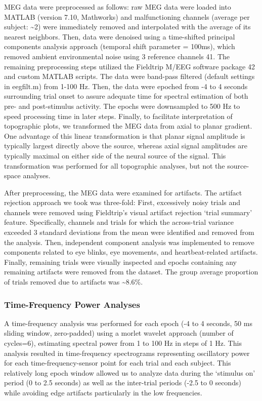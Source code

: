 MEG data were preprocessed as follows: raw MEG data were loaded into
MATLAB (version 7.10, Mathworks) and malfunctioning channels (average
per subject: \textasciitilde{}2) were immediately removed and
interpolated with the average of its nearest neighbors. Then, data were
denoised using a time-shifted principal components analysis approach
(temporal shift parameter = 100ms), which removed ambient environmental
noise using 3 reference channels 41. The remaining preprocessing steps
utilized the Fieldtrip M/EEG software package 42 and custom MATLAB
scripts. The data were band-pass filtered (default settings in
eegfilt.m) from 1-100 Hz. Then, the data were epoched from -4 to 4
seconds surrounding trial onset to assure adequate time for spectral
estimation of both pre- and post-stimulus activity. The epochs were
downsampled to 500 Hz to speed processing time in later steps. Finally,
to facilitate interpretation of topographic plots, we transformed the
MEG data from axial to planar gradient. One advantage of this linear
transformation is that planar signal amplitude is typically largest
directly above the source, whereas axial signal amplitudes are typically
maximal on either side of the neural source of the signal. This
transformation was performed for all topographic analyses, but not the
source-space analyses.

After preprocessing, the MEG data were examined for artifacts. The
artifact rejection approach we took was three-fold: First, excessively
noisy trials and channels were removed using Fieldtrip's visual artifact
rejection `trial summary' feature. Specifically, channels and trials for
which the across-trial variance exceeded 3 standard deviations from the
mean were identified and removed from the analysis. Then, independent
component analysis was implemented to remove components related to eye
blinks, eye movements, and heartbeat-related artifacts. Finally,
remaining trials were visually inspected and epochs containing any
remaining artifacts were removed from the dataset. The group average
proportion of trials removed due to artifacts was
\textasciitilde{}8.6\%.

\subsubsection{Time-Frequency Power
Analyses}\label{time-frequency-power-analyses}

A time-frequency analysis was performed for each epoch (-4 to 4 seconds,
50 ms sliding window, zero-padded) using a morlet wavelet approach
(number of cycles=6), estimating spectral power from 1 to 100 Hz in
steps of 1 Hz. This analysis resulted in time-frequency spectrograms
representing oscillatory power for each time-frequency-sensor point for
each trial and each subject. This relatively long epoch window allowed
us to analyze data during the `stimulus on' period (0 to 2.5 seconds) as
well as the inter-trial periods (-2.5 to 0 seconds) while avoiding edge
artifacts particularly in the low frequencies.

